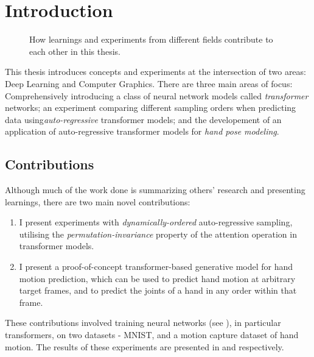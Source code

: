 \chapter{Introduction}
\label{C:intro}

\begin{figure}[t]
\centering
{}
\caption[The relationship between the different fields in this thesis]{How learnings and experiments from different fields contribute to each other in this thesis.}
\end{figure}

This thesis introduces concepts and experiments at the intersection of two areas: Deep Learning and Computer Graphics. There are three main areas of focus: Comprehensively introducing a class of neural network models called \textit{transformer} networks; an experiment comparing different sampling orders when predicting data using\textit{auto-regressive} transformer models; and the developement of an application of auto-regressive transformer models for \textit{hand pose modeling}.

\section{Contributions}

Although much of the work done is summarizing others' research and presenting learnings, there are two main novel contributions:
\begin{enumerate}
    \item I present experiments with \textit{dynamically-ordered} auto-regressive sampling, utilising the \textit{permutation-invariance} property of the attention operation in transformer models.
    \item I present a proof-of-concept transformer-based generative model for hand motion prediction, which can be used to predict hand motion at arbitrary target frames, and to predict the joints of a hand in any order within that frame.
\end{enumerate}
These contributions involved training neural networks (see ), in particular transformers, on two datasets - MNIST, and a motion capture dataset of hand motion. The results of these experiments are presented in  and  respectively.

